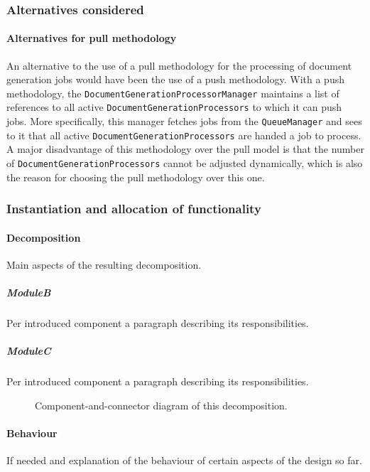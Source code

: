 \documentclass[a4paper,10pt]{article}
\begin{document}
\subsubsection*{Alternatives considered}
\paragraph{Alternatives for pull methodology}
An alternative to the use of a pull methodology for the processing of document generation jobs would have been the use of a push methodology. With a push methodology, the \texttt{DocumentGenerationProcessorManager} maintains a list of references to all active \texttt{DocumentGenerationProcessors} to which it can push jobs. More specifically, this manager fetches jobs from the \texttt{QueueManager} and sees to it that all active \texttt{DocumentGenerationProcessors} are handed a job to process. A major disadvantage of this methodology over the pull model is that the number of \texttt{DocumentGenerationProcessors} cannot be adjusted dynamically, which is also the reason for choosing the pull methodology over this one.

\subsubsection{Instantiation and allocation of functionality}
\paragraph{Decomposition}
Main aspects of the resulting decomposition.

\subparagraph{ModuleB}
Per introduced component a paragraph describing its responsibilities.

\subparagraph{ModuleC}
Per introduced component a paragraph describing its responsibilities.

\begin{figure}[!htp]
    \centering
    \caption{Component-and-connector diagram of this decomposition.
        }\label{fig:it1-cc_main}
\end{figure}

\paragraph{Behaviour}
If needed and explanation of the behaviour of certain aspects of the design so
far.
\end{document}

